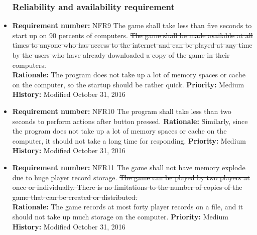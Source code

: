 \documentclass[12pt,letterpaper]{article}
\begin{document}
\begin{reqbox}
	\begin{itemize}
\subsubsection{Reliability and availability requirement}
\item \textbf{Requirement number: }NFR9
		The game shall take less than five seconds to start up on 90 percents of computers.
\st{   	The game shall be made available at all times to anyone who has access to the internet and can be played at any time by the users who have already downloaded a copy of the game in their computers.\\
}
		\textbf{Rationale: } The program does not take up a lot of memory spaces or cache on the computer, so the startup should be rather quick.
		\textbf{Priority: }Medium
		\textbf{History: }Modified October 31, 2016
		\item \textbf{Requirement number: }NFR10	
		The program shall take less than two seconds to perform actions after button pressed. 
		\textbf{Rationale: } Similarly, since the program does not take up a lot of memory spaces or cache on the computer, it should not take a long time for responding.
		\textbf{Priority: }Medium
		\textbf{History: }Modified October 31, 2016
	\end{itemize}
\end{reqbox}
\begin{reqbox}
	\begin{itemize}
\subsubsection{Capacity requirement}
\item \textbf{Requirement number: }NFR11
		The game shall not have memory explode due to huge player record storage.
\st{   	The game can be played by two players at once or individually. There is no limitations to the number of copies of the game that can be created or distributed.\\
}
		\textbf{Rationale: } The game records at most forty player records on a file, and it should not take up much storage on the computer.
		\textbf{Priority: }Medium
		\textbf{History: }Modified October 31, 2016
	\end{itemize}
\end{reqbox}
\end{document}
